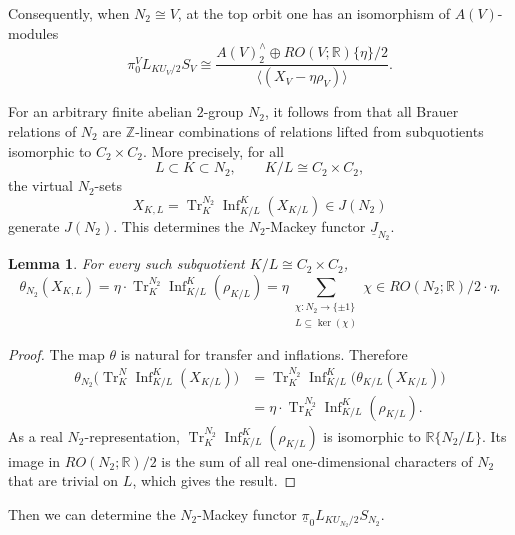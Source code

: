 \documentclass{amsart}
\theoremstyle{plain}
\newtheorem{lemma}[theorem]{Lemma}
\theoremstyle{definition}
\theoremstyle{remark}
\begin{document}
Consequently, when $N_2\cong V$, at the top orbit one has an isomorphism of $A(V)$-modules
\[
\pi_0^V L_{KU_V/2}S_V
  \cong
  \frac{A(V)^{\wedge}_2\oplus RO(V;\mathbb R)\{\eta\}/2}
       {\langle (X_V-\eta\rho_{V})\rangle}.
\]

For an arbitrary finite abelian $2$-group $N_2$, it follows from \cite[Theorem 5.3]{bartel2015brauer} that all Brauer relations of $N_2$ are $\mathbb{Z}$-linear combinations of relations lifted from subquotients isomorphic to $C_2\times C_2$. More precisely, for all
\[
  L\subset K\subset N_2,
  \qquad
  K/L\cong C_2\times C_2,
\]
the virtual $N_2$-sets
\[
  X_{K,L}=\operatorname{Tr}_K^{N_2}\operatorname{Inf}_{K/L}^{K}(X_{K/L})\in J(N_2)
\]
generate $J(N_2)$. This determines the $N_2$-Mackey functor $\underline{J}_{N_2}$.

\begin{lemma}\label{lem:theta-general}
For every such subquotient $K/L\cong C_2\times C_2$,
\[
\theta_{N_2}(X_{K,L})
  =
  \eta\cdot \operatorname{Tr}_K^{N_2}\operatorname{Inf}_{K/L}^{K}(\rho_{K/L})=
  \eta\sum_{\substack{\chi:N_2\to \{\pm1\}\\ L\subseteq \ker(\chi)}}\chi
  \in RO(N_2;\mathbb R)/2\cdot\eta.
\]
\end{lemma}
\begin{proof}
The map $\theta$ is natural for transfer and inflations. Therefore
\[
\begin{aligned}
    \theta_{N_2}\big(\operatorname{Tr}_K^N\operatorname{Inf}_{K/L}^{K}(X_{K/L})\big) & =  \operatorname{Tr}_K^{N_2}\operatorname{Inf}_{K/L}^{K}\big(\theta_{K/L}(X_{K/L})\big)\\
  & = \eta\cdot \operatorname{Tr}_K^{N_2}\operatorname{Inf}_{K/L}^{K}(\rho_{K/L}).
\end{aligned}
  \]
As a real $N_2$-representation, $\operatorname{Tr}_K^{N_2}\operatorname{Inf}_{K/L}^{K}(\rho_{K/L})$ is isomorphic to $\mathbb{R}\{N_2/L\}$.
Its image in $RO(N_2;\mathbb{R})/2$ is the sum of all real one-dimensional characters of $N_2$ that are
trivial on $L$, which gives the result.
\end{proof}

Then we can determine the $N_2$-Mackey functor $\underline{\pi}_0 L_{KU_{N_2}/2}S_{N_2}$.
\end{document}

